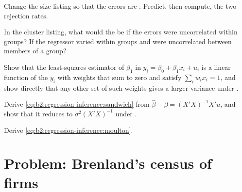 \begin{exercise}[$\star\star$]\label{exo:b2:regression-inference:8}
Change the size listing so that the errors are . Predict, then compute, the two rejection rates.
\end{exercise}

\begin{exercise}[$\star\star$]\label{exo:b2:regression-inference:9}
In the cluster listing, what would the  be if the errors were uncorrelated within groups? If the regressor
varied within groups and were uncorrelated between members of a group?
\end{exercise}

\begin{exercise}[$\star\star\star$]\label{exo:b2:regression-inference:10}
Show that the least-squares estimator of $\beta_1$ in $y_i = \beta_0 + \beta_1x_i + u_i$ is a linear function of the $y_i$
with weights that sum to zero and satisfy $\sum_iw_ix_i = 1$, and show directly that any other set of such weights gives a
larger variance under .
\end{exercise}

\begin{exercise}[$\star\star\star$]\label{exo:b2:regression-inference:11}
Derive \eqref{eq:b2:regression-inference:sandwich} from $\hat\beta - \beta = (X'X)^{-1}X'u$, and show that it reduces to
$\sigma^2(X'X)^{-1}$ under .
\end{exercise}

\begin{exercise}[$\star\star\star$]\label{exo:b2:regression-inference:12}
Derive \eqref{eq:b2:regression-inference:moulton}.
\end{exercise}

\section{Problem: Brenland's census of firms}\label{sec:b2:regression-inference:problem}

